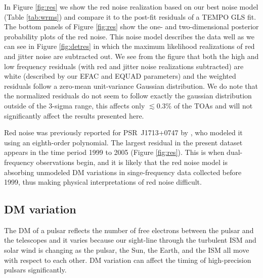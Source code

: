 In Figure \ref{fig:res} we show the red noise realization based on our best
noise model (Table \ref{tab:wrms}) and compare it to the post-fit residuals of
a {\sc TEMPO} GLS fit.
The bottom
panels of Figure \ref{fig:res} show the one- and two-dimensional posterior probability plots
of the red noise. This noise model describes the data well as we can see in
Figure \ref{fig:detres} in which the maximum likelihood realizations of red
and jitter noise are subtracted out. We see from the figure that both the high
and low frequency residuals (with red and jitter noise realizations
subtracted) are white (described by our EFAC and EQUAD parameters) and the
weighted residuals follow a zero-mean unit-variance Gaussian distribution. We
do note that the normalized residuals do not seem to follow exactly the gaussian 
distribution outside of the 3-sigma range, this affects only $\lesssim0.3$\% of the TOAs 
and will not significantly affect the results presented here. 

Red noise was previously reported for PSR~J1713+0747 by \citet{sns+05}, who
modeled it using an eighth-order polynomial. The largest residual in the
present dataset appears in the time period 1999 to 2005 (Figure
\ref{fig:res}). This is when dual-frequency observations begin, and it is
likely that the red noise model is absorbing unmodeled DM variations in
singe-frequency data collected before 1999, thus making physical
interpretations of red noise difficult.





\subsection{DM variation}
\label{sec:dmx}
The DM of a pulsar reflects the number of free electrons between
the pulsar and the telescopes and it varies because
our sight-line through the turbulent ISM and solar wind is changing as the
pulsar, the Sun, the Earth, and the ISM all move with respect to each other.
DM variation can affect the timing of high-precision pulsars significantly.

